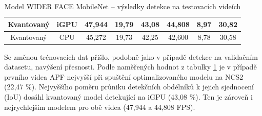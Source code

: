 \begin{table}[H]
\begin{tabular}{cc|ccc|ccc|}
  \multicolumn{1}{|c|}{\cellcolor[HTML]{E0DBDB}Kvantovaný}     & \cellcolor[HTML]{E0DBDB}iGPU & \multicolumn{1}{c|}{47,944}                                 & \multicolumn{1}{c|}{19,79}                                  & 43,08          & \multicolumn{1}{c|}{44,808}                                 & \multicolumn{1}{c|}{8,97}                                   & 30,82          \\ \hline
  \multicolumn{1}{|c|}{\cellcolor[HTML]{E0DBDB}Kvantovaný}     & \cellcolor[HTML]{E0DBDB}CPU  & \multicolumn{1}{c|}{45,272}                                 & \multicolumn{1}{c|}{19,73}                                  & 42,25          & \multicolumn{1}{c|}{42,600}                                 & \multicolumn{1}{c|}{8,78}                                   & 30,58          \\ \hline
  \end{tabular}
  \label{tabulka:wfmvidea}
  \caption{Model WIDER FACE MobileNet -- výsledky detekce na testovacích videích}
\end{table}

Se změnou trénovacích dat přišlo, podobně jako v případě detekce na validačním datasetu, navýšení přesnosti. Podle naměřených hodnot z tabulky \ref{tabulka:wfmvidea} je v případě prvního videa APF nejvyšší při spuštění optimalizovaného modelu na NCS2 (22,47 \%). Nejvyššího poměru průniku detekčních obdélníků k jejich sjednocení (IoU) dosáhl kvantovaný model detekující na iGPU (43,08 \%). Ten je zároveň i nejrychlejším modelem pro obě videa (47,944 a 44,808 FPS).

